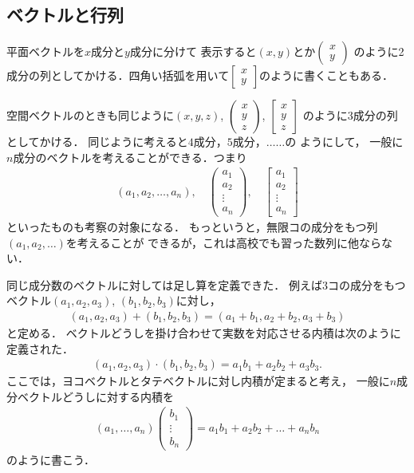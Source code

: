 \documentclass[11pt, a4paper, dvipdfmx]{jsarticle}
\theoremstyle{definition}
\theoremstyle{mystyle}
\numberwithin{equation}{section} %
\begin{document}
\subsection{ベクトルと行列}

平面ベクトルを$x$成分と$y$成分に分けて
表示すると$(x,y)$とか$\begin{pmatrix}
    x\\ y
\end{pmatrix}$
のように2成分の列としてかける．四角い括弧を用いて$\begin{bmatrix}
    x\\y
\end{bmatrix}$のように書くこともある．

空間ベクトルのときも同じように$(x,y,z)$, $\begin{pmatrix}
    x\\ y\\z
\end{pmatrix}$, $\begin{bmatrix}
    x\\y\\z
\end{bmatrix}$
のように3成分の列としてかける．
同じように考えると$4$成分，$5$成分，$\ldots\ldots$の
ようにして，
一般に$n$成分のベクトルを考えることができる．つまり
\begin{align*}
    (a_1,a_2,\dots,a_n),\quad\begin{pmatrix}
        a_1\\a_2\\ \vdots\\a_n
    \end{pmatrix},\quad\begin{bmatrix}
        a_1\\a_2\\ \vdots\\a_n
    \end{bmatrix}
\end{align*}
といったものも考察の対象になる．
もっというと，無限コの成分をもつ列$(a_1,a_2,\dots)$を考えることが
できるが，これは高校でも習った数列に他ならない．

同じ成分数のベクトルに対しては足し算を定義できた．
例えば3コの成分をもつベクトル$(a_1,a_2,a_3)$, $(b_1,b_2,b_3)$に対し，
\begin{align*}
    (a_1,a_2,a_3)+(b_1,b_2,b_3)
    =(a_1+b_1,a_2+b_2,a_3+b_3)
\end{align*}
と定める．
ベクトルどうしを掛け合わせて実数を対応させる内積は次のように定義された．
\begin{align*}
    (a_1,a_2,a_3)\cdot(b_1,b_2,b_3)
    =a_1b_1+a_2b_2+a_3b_3. 
\end{align*}
ここでは，ヨコベクトルとタテベクトルに対し内積が定まると考え，
一般に$n$成分ベクトルどうしに対する内積を
\begin{align*}
    (a_1,\dots,a_n)\begin{pmatrix}
        b_1\\\vdots\\b_n
    \end{pmatrix}
    =a_1b_1+a_2b_2+\dots+a_nb_n
\end{align*}
のように書こう．
\end{document}
